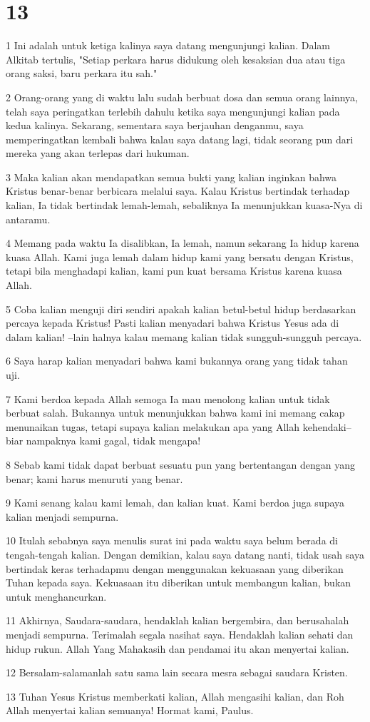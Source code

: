 \chapter{13}

\par 1 Ini adalah untuk ketiga kalinya saya datang mengunjungi kalian. Dalam Alkitab tertulis, "Setiap perkara harus didukung oleh kesaksian dua atau tiga orang saksi, baru perkara itu sah."
\par 2 Orang-orang yang di waktu lalu sudah berbuat dosa dan semua orang lainnya, telah saya peringatkan terlebih dahulu ketika saya mengunjungi kalian pada kedua kalinya. Sekarang, sementara saya berjauhan denganmu, saya memperingatkan kembali bahwa kalau saya datang lagi, tidak seorang pun dari mereka yang akan terlepas dari hukuman.
\par 3 Maka kalian akan mendapatkan semua bukti yang kalian inginkan bahwa Kristus benar-benar berbicara melalui saya. Kalau Kristus bertindak terhadap kalian, Ia tidak bertindak lemah-lemah, sebaliknya Ia menunjukkan kuasa-Nya di antaramu.
\par 4 Memang pada waktu Ia disalibkan, Ia lemah, namun sekarang Ia hidup karena kuasa Allah. Kami juga lemah dalam hidup kami yang bersatu dengan Kristus, tetapi bila menghadapi kalian, kami pun kuat bersama Kristus karena kuasa Allah.
\par 5 Coba kalian menguji diri sendiri apakah kalian betul-betul hidup berdasarkan percaya kepada Kristus! Pasti kalian menyadari bahwa Kristus Yesus ada di dalam kalian! --lain halnya kalau memang kalian tidak sungguh-sungguh percaya.
\par 6 Saya harap kalian menyadari bahwa kami bukannya orang yang tidak tahan uji.
\par 7 Kami berdoa kepada Allah semoga Ia mau menolong kalian untuk tidak berbuat salah. Bukannya untuk menunjukkan bahwa kami ini memang cakap menunaikan tugas, tetapi supaya kalian melakukan apa yang Allah kehendaki--biar nampaknya kami gagal, tidak mengapa!
\par 8 Sebab kami tidak dapat berbuat sesuatu pun yang bertentangan dengan yang benar; kami harus menuruti yang benar.
\par 9 Kami senang kalau kami lemah, dan kalian kuat. Kami berdoa juga supaya kalian menjadi sempurna.
\par 10 Itulah sebabnya saya menulis surat ini pada waktu saya belum berada di tengah-tengah kalian. Dengan demikian, kalau saya datang nanti, tidak usah saya bertindak keras terhadapmu dengan menggunakan kekuasaan yang diberikan Tuhan kepada saya. Kekuasaan itu diberikan untuk membangun kalian, bukan untuk menghancurkan.
\par 11 Akhirnya, Saudara-saudara, hendaklah kalian bergembira, dan berusahalah menjadi sempurna. Terimalah segala nasihat saya. Hendaklah kalian sehati dan hidup rukun. Allah Yang Mahakasih dan pendamai itu akan menyertai kalian.
\par 12 Bersalam-salamanlah satu sama lain secara mesra sebagai saudara Kristen.
\par 13 Tuhan Yesus Kristus memberkati kalian, Allah mengasihi kalian, dan Roh Allah menyertai kalian semuanya! Hormat kami, Paulus.


